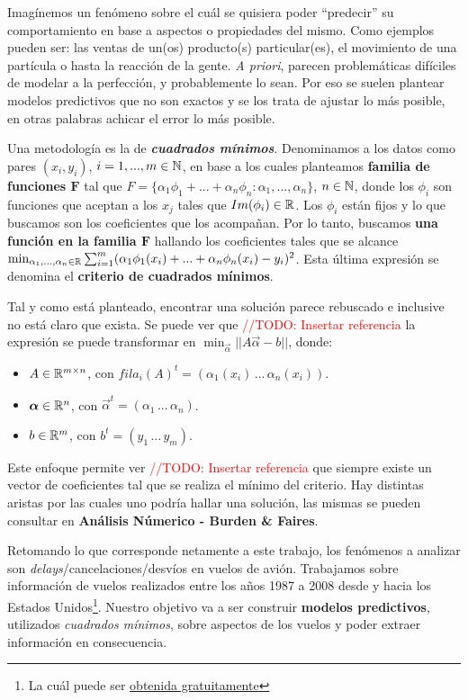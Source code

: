 Imag\'inemos un fen\'omeno sobre el cu\'al se quisiera poder ``predecir'' su comportamiento en base a aspectos o propiedades del mismo. Como ejemplos pueden ser: las ventas de un(os) producto(s) particular(es), el movimiento de una part\'icula o hasta la reacci\'on de la gente. \textit{A priori}, parecen problem\'aticas dif\'iciles de modelar a la perfecci\'on, y probablemente lo sean. Por eso se suelen plantear modelos predictivos que no son exactos y se los trata de ajustar lo m\'as posible, en otras palabras achicar el error lo m\'as posible.

Una metodolog\'ia es la de \textbf{\textit{cuadrados m\'inimos}}. Denominamos a los datos como pares $(x_i, y_i)$, $i = 1, ..., m \in {\mathbb N}$, en base a los cuales planteamos \textbf{familia de funciones $\mathbf{F}$} tal que $F = \{\alpha_1\phi_1 + ... + \alpha_n\phi_n : \alpha_1, ..., \alpha_n\}$, $n \in {\mathbb N}$, donde los $\phi_i$ son funciones que aceptan a los $x_j$ tales que $Im(\phi_i) \in {\mathbb R}$. Los $\phi_i$ est\'an fijos y lo que buscamos son los coeficientes que los acompa\~nan. Por lo tanto, buscamos \textbf{una funci\'on en la familia $\mathbf{F}$} hallando los coeficientes tales que se alcance $\min_{\alpha_1, ..., \alpha_n \in {\mathbb R}} \sum_{i = 1}^{m} (\alpha_1\phi_1(x_i) + ... + \alpha_n\phi_n(x_i) - y_i)^{2}$. Esta \'ultima expresi\'on se denomina el \textbf{criterio de cuadrados m\'inimos}.

Tal y como est\'a planteado, encontrar una soluci\'on parece rebuscado e inclusive no est\'a claro que exista. Se puede ver que \textcolor{red}{//TODO: Insertar referencia} la expresi\'on se puede transformar en $\min_{\vec{\alpha}}||A\vec{\alpha} - b||$, donde:

\begin{itemize}
\item $A \in {\mathbb R}^{m \times n}$, con $fila_i(A)^{t} = (\alpha_1(x_i) \, ... \, \alpha_n(x_i))$.
\item $\vec{\alpha} \in \Real^{n}$, con $\vec{\alpha}^{t} = (\alpha_1 \, ... \, \alpha_n)$.
\item $b \in {\mathbb R}^{m}$, con $b^{t} = (y_1 \, ... \, y_m)$.
\end{itemize}

Este enfoque permite ver \textcolor{red}{//TODO: Insertar referencia} que siempre existe un vector de coeficientes tal que se realiza el m\'inimo del criterio. Hay distintas aristas por las cuales uno podr\'ia hallar una soluci\'on, las mismas se pueden consultar en \textbf{An\'alisis N\'umerico - Burden \& Faires}.

Retomando lo que corresponde netamente a este trabajo, los fen\'omenos a analizar son \textit{delays}/cancelaciones/desv\'ios en vuelos de avi\'on. Trabajamos sobre informaci\'on de vuelos realizados entre los a\~nos 1987 a 2008 desde y hacia los Estados Unidos\footnote{La cu\'al puede ser \href{http://stat-computing.org/dataexpo/2009/the-data.html}{obtenida gratuitamente}}. Nuestro objetivo va a ser construir \textbf{modelos predictivos}, utilizados \textit{cuadrados m\'inimos}, sobre aspectos de los vuelos y poder extraer informaci\'on en consecuencia.

